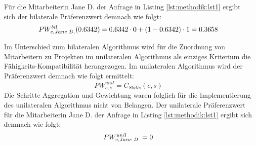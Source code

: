 Für die Mitarbeiterin Jane D. der Anfrage in Listing \ref{lst:methodik:lst1} ergibt sich der bilaterale Präferenzwert demnach wie folgt:
\begin{equation}\label{methodik:eq:9}
    PW_{c,Jane \textnormal{ }D.}^{bil}(0.6342) = 0.6342 \cdot 0 + (1-0.6342) \cdot 1 = 0.3658
\end{equation}

Im Unterschied zum bilateralen Algorithmus wird für die Zuordnung von Mitarbeitern zu Projekten im unilateralen Algorithmus als einziges Kriterium die Fähigkeits-Kompatibilität herangezogen.
Im unilateralen Algorithmus wird der Präferenzwert demnach wie folgt ermittelt:
\begin{equation}\label{methodik:eq:8}
    PW_{c,s}^{unil} = C_{Skills}(c,s)
\end{equation}
Die Schritte Aggregation und Gewichtung waren folglich für die Implementierung des unilateralen Algorithmus nicht von Belangen.
Der unilaterale Präferenzwert für die Mitarbeiterin Jane D. der Anfrage in Listing \ref{lst:methodik:lst1} ergibt sich demnach wie folgt:
\begin{equation}\label{methodik:eq:10}
    PW_{c,Jane \textnormal{ }D.}^{unil} = 0
\end{equation}



